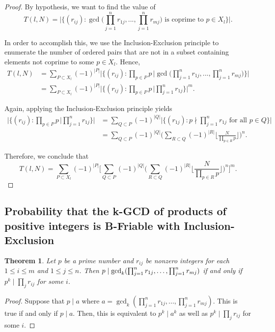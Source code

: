 \documentclass[12pt]{amsart}
\newtheorem{theorem}{Theorem}[subsection]
\theoremstyle{definition}
\begin{document}
\begin{proof}
By hypothesis, we want to find the value of
$$T(l,N) = \Big|\Big\{(r_{ij}) : \gcd\Big(\prod_{j=1}^nr_{1j}, ..., \prod_{j=1}^{n} r_{mj}\Big) \text{ is coprime to } p\in X_l \Big\}\Big|.$$
	
In order to accomplish this, we use the Inclusion-Exclusion principle to enumerate the number of ordered pairs that are not in a subset containing elements not coprime to some $p\in X_l$. Hence, 
	\begin{align*}
		T(l, N) &= \sum_{P\subset X_l}{(-1)^{|P|}}\Bigg|\Big\{(r_{ij}):\prod_{p\in P} p \, \Big| \gcd\Big(\prod_{j=1}^nr_{1j}, ... ,\prod_{j=1}^{n} r_{mj}\Big) \Big\} \Bigg|\\ &= \sum_{P\subset X_l}{(-1)^{|P|}} \Bigg|\Big\{(r_{ij}):\prod_{p\in P} p \, \Big| \prod_{j=1}^nr_{1j}\Big\}\Bigg|^m.
	\end{align*}
	
	\noindent Again, applying the Inclusion-Exclusion principle yields
	\begin{align*}
		\Bigg|\Big\{(r_{ij}):\prod_{p\in P} p \, \Big|\prod_{j=1}^nr_{1j}\Big\}\Bigg| &=\sum_{Q\subset P}(-1)^{|Q|}\Big|\Big\{(r_{1j}): p \nmid \prod_{j=1}^nr_{1j} \text{ for all } p\in Q \Big\}\Big|\\
		&=\sum_{Q\subset P}(-1)^{|Q|}\Biggl(\sum_{R\subset Q}(-1)^{|R|}\Biggl\lfloor\frac{N}{\prod_{p\in R} p}\Biggr\rfloor\Biggr)^n.
	\end{align*}
	
	\noindent Therefore, we conclude that
	$$T(l,N)=\sum_{P\subset X_l}{(-1)^{|P|}}\Bigg[\sum_{Q\subset P}(-1)^{|Q|}\Big(\sum_{R\subset Q}(-1)^{|R|}\Big\lfloor\frac{N}{\prod_{p\in R} p}\Big\rfloor\Big)^n\Bigg]^m.$$
\end{proof}

\subsection{Probability that the k-GCD of products of positive integers is  B-Friable with Inclusion-Exclusion}

\begin{theorem} Let $p$ be a prime number and $r_{ij}$ be nonzero integers for each $1 \leq i \leq m$ and $1 \leq j \leq n$. Then
	$p \mid \gcd_k(\prod_{j=1}^{n}r_{1j},\mathellipsis,\prod_{j=1}^n r_{mj})$ if and only if $p^k \mid \prod_{j}r_{ij}$ for some $i$.
\end{theorem}

\begin{proof}
	Suppose that $p \mid a$ where $a = \gcd_k(\prod_{j=1}^n r_{1j}, ...,\prod_{j=1}^n r_{mj})$. This is true if and only if $p \mid a$. Then, this is equivalent to $p^k \mid a^k$ as well as $p^k \mid \prod_j r_{ij}$ for some $i$.
\end{proof}
\end{document}
